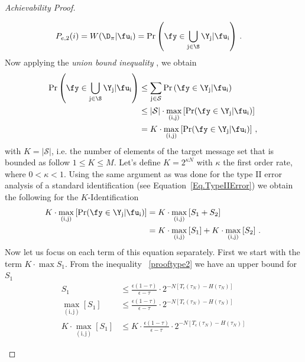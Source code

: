 \begin{proof}[Achievability Proof]
\begin{itemize}
\begin{enumerate}
\begin{align}
      P_{e,2}(i)& = W(\D_\pi|\fu_\text{i}) = \Pr \left(\fy \in \bigcup_{\text{j} \in \S} \Y_\text{j}|\fu_\text{i} \right)\,.\, 
\end{align}
Now applying the \emph{union bound inequality} \cite[Theorem~2.4]{Rozanov2013}, we obtain 
\begin{align}
    \Pr \left( \fy\in \bigcup_{\text{j}\in \S} \Y_\text{j}|\fu_\text{i} \right) &\leq \sum_{\text{j} \in \mathcal{S}} \Pr\left(\fy\in \Y_\text{j}|\fu_\text{i}\right)
    \nonumber\\
    & \leq \left| \mathcal{S} \right| \cdot \underset{(\text{i},\text{j})}{\max} \left[ \Pr(\fy\in \Y_\text{j}|\fu_\text{i}) \right]
    \nonumber\\
    & = K \cdot \underset{(\text{i},\text{j})}{\max} \left[ \Pr(\fy\in \Y_\text{j}|\fu_\text{i}) \right]\,,\,
\end{align}
with $K=\left|\mathcal{S}\right|$, i.e. the number of elements of the target message set that is bounded as follow $1\leq K \leq M$. Let's define $K=2^{\kappa N}$ with $\kappa$ the first order rate, where $0<\kappa <1$. Using the same argument as was done for the type II error analysis of a standard identification (see Equation~\eqref{Eq.TypeIIError}) we obtain the following for the $K$-Identification
\begin{align}
    \label{Eq.TypeII_Split}
  K \cdot \underset{(\text{i},\text{j})}{\max} \left[ \Pr(\fy\in \Y_\text{j}|\fu_\text{i}) \right] &=K\cdot\underset{(\text{i},\text{j})}{\max} \left[S_1+S_2\right]
    \nonumber\\
    &= K \cdot \underset{(\text{i},\text{j})}{\max} \left[ S_1 \right] + K\cdot \underset{(\text{i},\text{j})}{\max} \left[ S_2 \right] \,.\,
\end{align}
Now let us focus on each term of this equation separately. First we start with the term $K\cdot\max S_1$. From the inequality ~\eqref{prooftype2} we have an upper bound for $S_1$
\begin{align}
    S_1 &\leq  \frac{\epsilon(1-\tau)}{\epsilon-\tau}\cdot 2^{-N\left[T_{\epsilon}(\tau_N) - H(\tau_N)\right]}
    \nonumber\\
  \underset{(\text{i},\text{j})}{\max} \left[ S_1 \right] &\leq  \frac{\epsilon(1-\tau)}{\epsilon-\tau}\cdot 2^{-N\left[T_{\epsilon}(\tau_N) - H(\tau_N)\right]}
    \nonumber\\
    K\cdot \underset{(\text{i},\text{j})}{\max} \left[ S_1 \right] &\leq K\cdot \frac{\epsilon(1-\tau)}{\epsilon-\tau}\cdot 2^{-N\left[T_{\epsilon}(\tau_N) - H(\tau_N)\right]}

\end{align}
\end{enumerate}
\end{itemize}
\end{proof}
